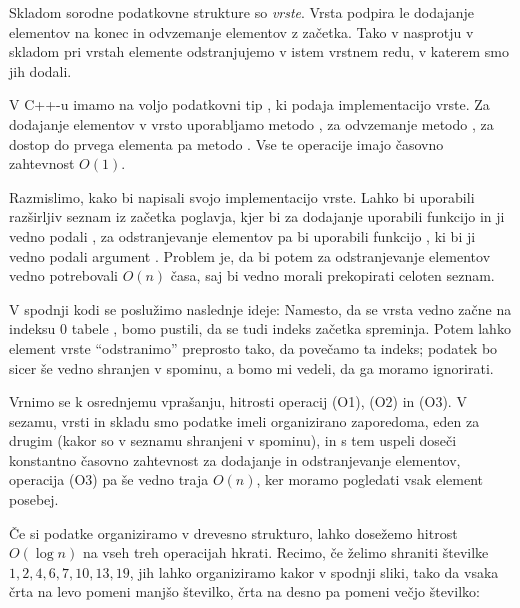 Skladom sorodne podatkovne strukture so \emph{vrste}.
Vrsta podpira le dodajanje elementov na konec in odvzemanje elementov z začetka.
Tako v nasprotju v skladom pri vrstah elemente odstranjujemo v istem vrstnem
redu, v katerem smo jih dodali.

V C++-u imamo na voljo podatkovni tip , ki podaja implementacijo
vrste.
Za dodajanje elementov v vrsto uporabljamo metodo , za odvzemanje
metodo , za dostop do prvega elementa pa metodo .
Vse te operacije imajo časovno zahtevnost $O(1)$.


Razmislimo, kako bi napisali svojo implementacijo vrste.
Lahko bi uporabili razširljiv seznam iz začetka poglavja, kjer bi za dodajanje
uporabili funkcijo  in ji vedno podali
, za odstranjevanje elementov pa bi uporabili funkcijo
, ki bi ji vedno podali argument .
Problem je, da bi potem za odstranjevanje elementov vedno potrebovali $O(n)$
časa, saj bi vedno morali prekopirati celoten seznam.

V spodnji kodi se poslužimo naslednje ideje:
Namesto, da se vrsta vedno začne na indeksu $0$ tabele , bomo pustili,
da se tudi indeks začetka spreminja.
Potem lahko element vrste \enquote{odstranimo} preprosto tako, da povečamo ta
indeks; podatek bo sicer še vedno shranjen v spominu, a bomo mi vedeli, da ga
moramo ignorirati.



Vrnimo se k osrednjemu vprašanju, hitrosti operacij (O1), (O2) in (O3).
V sezamu, vrsti in skladu smo podatke imeli organizirano zaporedoma, eden za
drugim (kakor so v seznamu shranjeni v spominu), in s tem uspeli doseči
konstantno časovno zahtevnost za dodajanje in odstranjevanje elementov,
operacija (O3) pa še vedno traja $O(n)$, ker moramo pogledati vsak element
posebej.

Če si podatke organiziramo v drevesno strukturo, lahko dosežemo hitrost $O(\log
n)$ na vseh treh operacijah hkrati.
Recimo, če želimo shraniti številke $1, 2, 4, 6, 7, 10, 13, 19$, jih lahko
organiziramo kakor v spodnji sliki, tako da vsaka črta na levo pomeni manjšo
številko, črta na desno pa pomeni večjo številko:

\begin{figure}[ht!]
  \centering
\end{figure}

